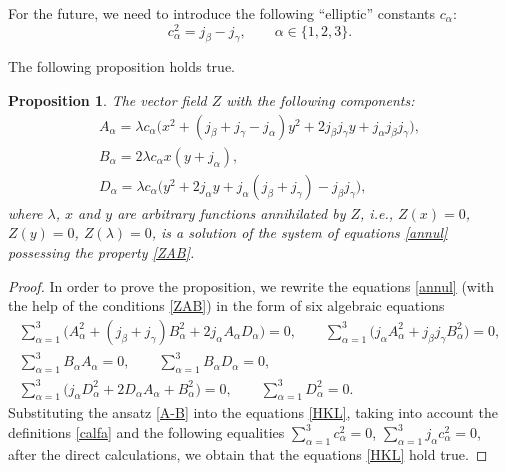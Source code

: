\documentclass[pdftex]{sigma}
\def\a{\alpha}
\def\b{\beta}
\def\g{\gamma}
\def\l{\lambda}
\numberwithin{equation}{section}
\newtheorem{Proposition}[Theorem]{Proposition}
\begin{document}
For the future, we need to introduce the following ``elliptic'' constants $c_{\a}$:
\begin{equation}\label{calfa}
c^2_{\a}=j_{\b}-j_{\g}, \qquad \a\in \{1,2,3\}.
\end{equation}

The following proposition holds true.
\begin{Proposition}
The vector field $Z$ with the following components:
\begin{subequations}\label{A-B}
\begin{gather}
A_{\a} =\l c_{\a} \big(x^2+(j_{\b}+j_{\g}-j_{\a}) y^2+2 j_{\b} j_{\g} y + j_{\a} j_{\b} j_{\g}\big),\label{Ai}
\\
B_{\a} = 2 \l c_{\a} x (y+j_{\a}),\label{Bi}
\\
D_{\a} = \l c_{\a} \big(y^2+2j_{\a} y+ j_{\a}(j_{\b}+j_{\g})-j_{\b}j_{\g}\big) ,\label{Di}
\end{gather}
\end{subequations}
where $\l$, $x$ and $y$ are arbitrary functions annihilated
by $Z$, i.e., $Z(x)=0$, $Z(y)=0$, $Z(\l)=0$, is a solution of the system
of equations \eqref{annul} possessing the property \eqref{ZAB}.
\end{Proposition}

\begin{proof}
 In order to prove the proposition, we rewrite the equations \eqref{annul} (with the help of the conditions \eqref{ZAB}) in the form of six algebraic equations
\begin{subequations}\label{HKL}
\begin{gather}
\sum\limits_{\a=1}^3 \big(A_{\a}^2+ (j_{\b}+j_{\g}) B^2_{\a}+ 2 j_{\a} A_{\a} D_{\a}\big)=0, \qquad
 \sum\limits_{\a=1}^3 \big(j_{\a} A_{\a}^2+ j_{\b}j_{\g} B^2_{\a}\big)=0, \label{H}\\ \sum_{\a=1}^3B_{\a}A_{\a}=0,
\qquad
\sum_{\a=1}^3B_{\a}D_{\a}=0,\\
 \sum_{\a=1}^3 \big(j_{\a} D^2_{\a} + 2 D_{\a} A_{\a} +B_{\a}^2 \big)=0, \qquad \sum_{\a=1}^3 D^2_{\a}=0.\label{C3}
\end{gather}
\end{subequations}
Substituting the ansatz \eqref{A-B} into the equations \eqref{HKL}, taking into account the definitions
\eqref{calfa} and the following equalities
$
\sum_{\a=1}^3 c_{\a}^2=0$, $ \sum_{\a=1}^3 j_{\a} c_{\a}^2=0$,
after the direct calculations, we obtain that the equations \eqref{HKL} hold true.
\end{proof}
\end{document}
